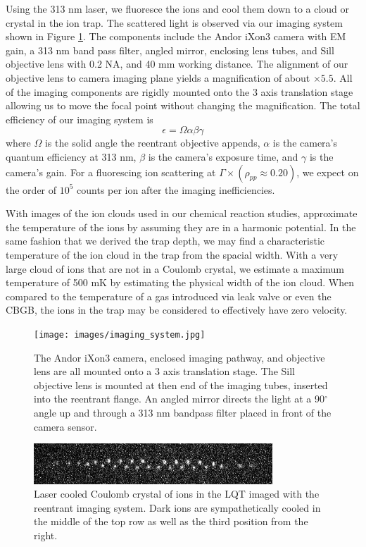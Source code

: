 Using the 313 nm laser, we fluoresce the  ions and cool them down to a cloud or crystal in the ion trap. The scattered light is observed via our imaging system shown in Figure \ref{fig: imaging system}. The components include the Andor iXon3 camera with EM gain, a 313 nm band pass filter, angled mirror, enclosing lens tubes, and Sill objective lens with 0.2 NA, and 40 mm working distance. The alignment of our objective lens to camera imaging plane yields a magnification of about $\times5.5$. All of the imaging components are rigidly mounted onto the 3 axis translation stage allowing us to move the focal point without changing the magnification. The total efficiency of our imaging system is
\begin{equation}
	\epsilon = \Omega \alpha \beta \gamma
	\label{eq: fluorescence efficiency}
\end{equation}
where $\Omega$ is the solid angle the reentrant objective appends, $\alpha$ is the camera's quantum efficiency at 313 nm, $\beta$ is the camera's exposure time, and $\gamma$ is the camera's gain. For a fluorescing ion scattering at $\Gamma \times (\rho_{pp} \approx 0.20)$, we expect on the order of $10^5$ counts per ion after the imaging inefficiencies.

With images of the ion clouds used in our chemical reaction studies, approximate the temperature of the ions by assuming they are in a harmonic potential. In the same fashion that we derived the trap depth, we may find a characteristic temperature of the ion cloud in the trap from the spacial width. With a very large cloud of ions that are not in a Coulomb crystal, we estimate a maximum temperature of 500 mK by estimating the physical width of the ion cloud. When compared to the temperature of a gas introduced via leak valve or even the CBGB, the ions in the trap may be considered to effectively have zero velocity.

\begin{figure}[H]
	\centering
	\texttt{[image: images/imaging\_system.jpg]}
	\caption{The Andor iXon3 camera, enclosed imaging pathway, and objective lens are all mounted onto a 3 axis translation stage. The Sill objective lens is mounted at then end of the imaging tubes, inserted into the reentrant flange. An angled mirror directs the light at a 90$^\circ$ angle up and through a 313 nm bandpass filter placed in front of the camera sensor.}
	\label{fig: imaging system}
\end{figure}

\begin{figure}
	\centering
	\includegraphics[width=0.8\textwidth]{images/ion_crystal.png}
	\caption{Laser cooled Coulomb crystal of  ions in the LQT imaged with the reentrant imaging system. Dark  ions are sympathetically cooled in the middle of the top row as well as the third position from the right.}
	\label{fig: ion crystal}
\end{figure}